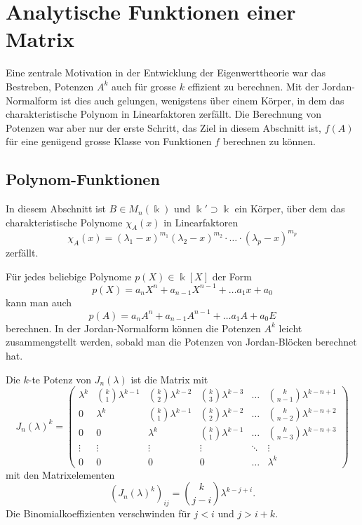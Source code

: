 %
%
%
\section{Analytische Funktionen einer Matrix
\label{buch:section:analytische-funktionen-einer-matrix}}
Eine zentrale Motivation in der Entwicklung der Eigenwerttheorie
war das Bestreben, Potenzen $A^k$ auch für grosse $k$ effizient
zu berechnen.
Mit der Jordan-Normalform ist dies auch gelungen, wenigstens über
einem Körper, in dem das charakteristische Polynom in Linearfaktoren
zerfällt.
Die Berechnung von Potenzen war aber nur der erste Schritt, das Ziel
in diesem Abschnitt ist, $f(A)$ für eine genügend grosse Klasse von
Funktionen $f$ berechnen zu können.

%
%
\subsection{Polynom-Funktionen
\label{buch:subsection:polynom-funktionen}}
In diesem Abschnitt ist $B\in M_n(\Bbbk)$ und $\Bbbk'\supset\Bbbk$ ein
Körper, über dem das charakteristische Polynome $\chi_A(x)$ in
Linearfaktoren
\[
\chi_A(x)
=
(\lambda_1-x)^{m_1}(\lambda_2-x)^{m_2}\cdot\ldots\cdot(\lambda_p-x)^{m_p}
\]
zerfällt.

Für jedes beliebige Polynome $p(X)\in\Bbbk[X]$ der Form
\[
p(X) = a_nX^n + a_{n-1}X^{n-1} + \dots a_1x + a_0
\]
kann man auch
\[
p(A) = a_nA^n + a_{n-1}A^{n-1} + \dots a_1A + a_0E
\]
berechnen.
In der Jordan-Normalform können die Potenzen $A^k$ leicht zusammengstellt
werden, sobald man die Potenzen von Jordan-Blöcken berechnet hat.

\begin{satz}
Die $k$-te Potenz von $J_n(\lambda)$ ist die Matrix mit
\begin{equation}
J_n(\lambda)^k
=
\begin{pmatrix}
\lambda^k
	& \binom{k}{1}\lambda^{k-1}
		& \binom{k}{2} \lambda^{k-2}
			& \binom{k}{3} \lambda^{k-3}
				& \dots
					&\binom{k}{n-1}\lambda^{k-n+1}
\\
0
	& \lambda^k
		& \binom{k}{1}\lambda^{k-1}
			& \binom{k}{2} \lambda^{k-2}
				& \dots
					&\binom{k}{n-2}\lambda^{k-n+2}
\\
0
	& 0
		& \lambda^k
			& \binom{k}{1}\lambda^{k-1}
				& \dots
					&\binom{k}{n-3}\lambda^{k-n+3}
\\
\vdots  &\vdots &\vdots &\vdots &\ddots & \vdots
\\
0	& 0	& 0	& 0	& \dots	& \lambda^k
\end{pmatrix}
\label{buch:eigenwerte:eqn:Jnkpotenz}
\end{equation}
mit den Matrixelementen
\[
(J_n(\lambda)^k)_{ij}
=
\binom{k}{j-i}\lambda^{k-j+i}.
\]
Die Binomialkoeffizienten verschwinden für $j<i$ und $j>i+k$.
\end{satz}

